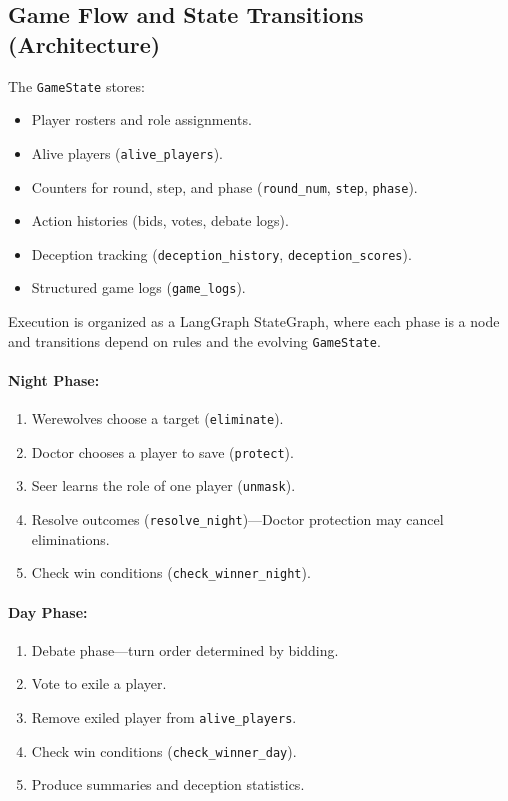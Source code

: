 \documentclass[12pt]{article}
\begin{document}
\subsection{Game Flow and State Transitions (Architecture)}
The \texttt{GameState} stores:
\begin{itemize}
    \item Player rosters and role assignments.
    \item Alive players (\texttt{alive\_players}).
    \item Counters for round, step, and phase (\texttt{round\_num}, \texttt{step}, \texttt{phase}).
    \item Action histories (bids, votes, debate logs).
    \item Deception tracking (\texttt{deception\_history}, \texttt{deception\_scores}).
    \item Structured game logs (\texttt{game\_logs}).
\end{itemize}

Execution is organized as a LangGraph StateGraph, where each phase is a node and transitions depend on rules and the evolving \texttt{GameState}.

\paragraph{Night Phase:}
\begin{enumerate}
    \item Werewolves choose a target (\texttt{eliminate}).
    \item Doctor chooses a player to save (\texttt{protect}).
    \item Seer learns the role of one player (\texttt{unmask}).
    \item Resolve outcomes (\texttt{resolve\_night})—Doctor protection may cancel eliminations.
    \item Check win conditions (\texttt{check\_winner\_night}).
\end{enumerate}

\paragraph{Day Phase:}
\begin{enumerate}
    \item Debate phase—turn order determined by bidding.
    \item Vote to exile a player.
    \item Remove exiled player from \texttt{alive\_players}.
    \item Check win conditions (\texttt{check\_winner\_day}).
    \item Produce summaries and deception statistics.
\end{enumerate}
\end{document}
